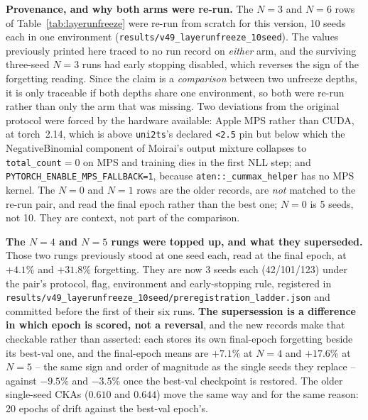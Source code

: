 \textbf{Provenance, and why both arms were re-run.}  The $N{=}3$ and $N{=}6$ rows
of Table~\ref{tab:layerunfreeze} were re-run from scratch for this version, 10
seeds each in one environment
(\texttt{results/v49\_layerunfreeze\_10seed}).  The values previously printed
here traced to no run record on \emph{either} arm, and the surviving three-seed
$N{=}3$ runs had early stopping disabled, which reverses the sign of the
forgetting reading.  Since the claim is a \emph{comparison} between two unfreeze
depths, it is only traceable if both depths share one environment, so both were
re-run rather than only the arm that was missing.  Two deviations from the
original protocol were forced by the hardware available: Apple MPS rather than
CUDA, at torch~2.14, which is above \texttt{uni2ts}'s declared \texttt{<2.5} pin
but below which the NegativeBinomial component of Moirai's output mixture
collapses to \texttt{total\_count}${=}0$ on MPS and training dies in the first
NLL step; and \texttt{PYTORCH\_ENABLE\_MPS\_FALLBACK=1}, because
\texttt{aten::\_cummax\_helper} has no MPS kernel.  The $N{=}0$ and $N{=}1$ rows
are the older records, are \emph{not} matched to the re-run pair, and read the
final epoch rather than the best one; $N{=}0$ is 5 seeds, not 10.  They are
context, not part of the comparison.

\textbf{The $N{=}4$ and $N{=}5$ rungs were topped up, and what they superseded.}
Those two rungs previously stood at one seed each, read at the final epoch, at
$+4.1$\% and $+31.8$\% forgetting.  They are now 3 seeds each (42/101/123) under
the pair's protocol, flag, environment and early-stopping rule, registered in
\texttt{results/v49\_layerunfreeze\_10seed/preregistration\_ladder.json} and
committed before the first of their six runs.  \textbf{The supersession is a
difference in which epoch is scored, not a reversal}, and the new records make
that checkable rather than asserted: each stores its own final-epoch forgetting
beside its best-val one, and the final-epoch means are $+7.1$\% at $N{=}4$ and
$+17.6$\% at $N{=}5$ -- the same sign and order of magnitude as the single seeds
they replace -- against $-9.5$\% and $-3.5$\% once the best-val checkpoint is
restored.  The older single-seed CKAs ($0.610$ and $0.644$) move the same way and
for the same reason: 20 epochs of drift against the best-val epoch's.

